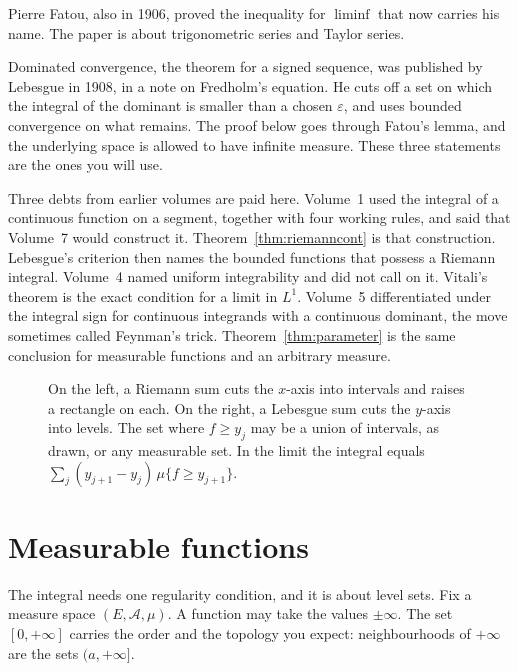 Pierre Fatou, also in 1906, proved the inequality for \(\liminf\) that now carries his name. The paper is about trigonometric series and Taylor series.


Dominated convergence, the theorem for a signed sequence, was published by Lebesgue in 1908, in a note on Fredholm's equation. He cuts off a set on which the integral of the dominant is smaller than a chosen \(\varepsilon\), and uses bounded convergence on what remains. The proof below goes through Fatou's lemma, and the underlying space is allowed to have infinite measure. These three statements are the ones you will use.

Three debts from earlier volumes are paid here. Volume~1 used the integral of a continuous function on a segment, together with four working rules, and said that Volume~7 would construct it. Theorem~\ref{thm:riemanncont} is that construction. Lebesgue's criterion then names the bounded functions that possess a Riemann integral. Volume~4 named uniform integrability and did not call on it. Vitali's theorem is the exact condition for a limit in \(L^1\). Volume~5 differentiated under the integral sign for continuous integrands with a continuous dominant, the move sometimes called Feynman's trick. Theorem~\ref{thm:parameter} is the same conclusion for measurable functions and an arbitrary measure.

\begin{figure}[ht]
\centering
{}
\caption{On the left, a Riemann sum cuts the \(x\)-axis into intervals and raises a rectangle on each. On the right, a Lebesgue sum cuts the \(y\)-axis into levels. The set where \(f\ge y_j\) may be a union of intervals, as drawn, or any measurable set. In the limit the integral equals \(\sum_j(y_{j+1}-y_j)\,\mu\{f\ge y_{j+1}\}\).}
\label{fig:sums}
\end{figure}

\section{Measurable functions}

The integral needs one regularity condition, and it is about level sets. Fix a measure space \((E,\mathcal A,\mu)\). A function may take the values \(\pm\infty\). The set \([0,+\infty]\) carries the order and the topology you expect: neighbourhoods of \(+\infty\) are the sets \((a,+\infty]\).

